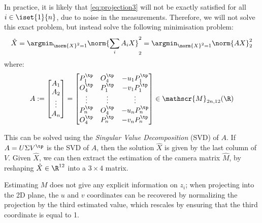 In practice, it is likely that \eqref{eq:projection3} will not be exactly satisfied for all $i\in\iset{1}{n}$, due to noise in the measurements. Therefore, we will not solve this exact problem, but instead solve the following minimisation problem:
\begin{equation}
    \hat{X} = \argmin_{\norm{X}^2=1} \norm{\sum_iA_iX}_2^2 = \argmin_{\norm{X}^2=1} \norm{AX}_2^2
\end{equation}
where:
\begin{equation*}
    A := \begin{bmatrix}
        A_1 \\ A_2 \\ \vdots \\ A_n
    \end{bmatrix}
    = \begin{bmatrix}
        P_1^\tp & O_4^\tp & -u_1P_1^\tp \\
        O_4^\tp & P_1^\tp & -v_1P_1^\tp \\
        \vdots & \vdots & \vdots \\
        P_n^\tp & O_4^\tp & -u_nP_n^\tp \\
        O_4^\tp & P_n^\tp & -v_nP_n^\tp
    \end{bmatrix} \in\mathscr{M}_{2n,12}(\R)
\end{equation*}

This can be solved using the \emph{Singular Value Decomposition} (SVD) of $A$. If $A = U\Sigma V^\tp$ is the SVD of $A$, then the solution $\hat{X}$ is given by the last column of $V$. Given $\hat{X}$, we can then extract the estimation of the camera matrix $\hat{M}$, by reshaping $\hat{X}\in\R^{12}$ into a $3\times4$ matrix.

\begin{remark}
    Estimating $M$ does not give any explicit information on $z_i$; when projecting into the 2D plane, the $u$ and $v$ coordinates can be recovered by normalizing the projection by the third estimated value, which rescales by ensuring that the third coordinate is equal to 1.
\end{remark}

